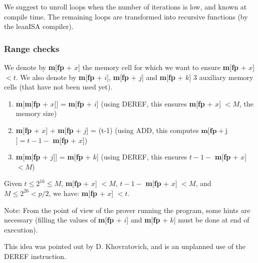 \documentclass{article}
\theoremstyle{definition}
\begin{document}
We suggest to unroll loops when the number of iterations is low, and known at compile time.
The remaining loops are transformed into recursive functions (by the leanISA compiler).

\subsubsection{Range checks}


We denote by \textbf{m}[\textbf{fp} + $x$] the memory cell for which we want to ensure \textbf{m}[\textbf{fp} + $x$] $< t$.
We also denote by \textbf{m}[\textbf{fp} + $i$], \textbf{m}[\textbf{fp} + $j$] and \textbf{m}[\textbf{fp} + $k$] 3 auxiliary memory cells (that have not been used yet).
\begin{enumerate}
    \item \textbf{m}[\textbf{m}[\textbf{fp} + $x$]] = \textbf{m}[\textbf{fp} + $i$] (using DEREF, this ensures \textbf{m}[\textbf{fp} + $x$] $ < M$, the memory size)
    \item \textbf{m}[\textbf{fp} + $x$] + \textbf{m}[\textbf{fp} + $j$] = (t-1) (using ADD, this computes $\textbf{m}[\textbf{fp} + $j$] = t - 1 - $ \textbf{m}[\textbf{fp} + $x$])
        \item \textbf{m}[\textbf{m}[\textbf{fp} + $j$]] = \textbf{m}[\textbf{fp} + $k$] (using DEREF, this ensures $t - 1 - $ \textbf{m}[\textbf{fp} + $x$] $ < M$)
\end{enumerate}

Given $t \leq 2^{16} \leq M$, \textbf{m}[\textbf{fp} + $x$] $ < M$, $t - 1 - $ \textbf{m}[\textbf{fp} + $x$] $< M$, and $M \leq 2^{26} < p / 2$, we have: \textbf{m}[\textbf{fp} + $x$] $ < t$.

Note: From the point of view of the prover running the program, some hints are necessary (filling the values of \textbf{m}[\textbf{fp} + $i$] and \textbf{m}[\textbf{fp} + $k$] must be done at end of execution).

This idea was pointed out by D. Khovratovich, and is an unplanned use of the DEREF instruction.
\end{document}
